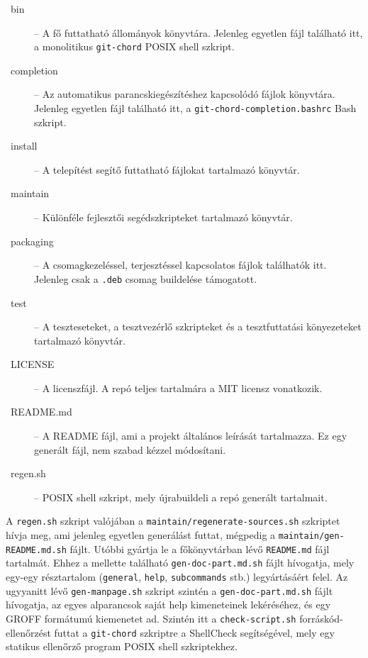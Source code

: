 \documentclass[
]{elteikthesis}[2025/03/25]
\begin{document}
\begin{description}
    \item[\faFolder~bin] --
        A fő futtatható állományok könyvtára.
        Jelenleg egyetlen fájl található itt, a monolitikus \verb|git-chord| POSIX shell szkript.
    \item[\faFolder~completion] --
        Az automatikus parancskiegészítéshez kapcsolódó fájlok könyvtára.
        Jelenleg egyetlen fájl található itt, a \verb|git-chord-completion.bashrc| Bash szkript.
    \item[\faFolder~install] --
        A telepítést segítő futtatható fájlokat tartalmazó könyvtár.
    \item[\faFolder~maintain] --
        Különféle fejlesztői segédszkripteket tartalmazó könyvtár.
    \item[\faFolder~packaging] --
        A csomagkezeléssel, terjesztéssel kapcsolatos fájlok találhatók itt.
        Jelenleg csak a \verb|.deb| csomag buildelése támogatott.
    \item[\faFolder~test] --
        A teszteseteket, a tesztvezérlő szkripteket és a tesztfuttatási könyezeteket
        tartalmazó könyvtár.
    \item[\faFile~LICENSE] --
        A licenszfájl.
        A repó teljes tartalmára a MIT licensz vonatkozik.
    \item[\faFile~README.md] --
        A README fájl, ami a projekt általános leírását tartalmazza.
        Ez egy generált fájl, nem szabad kézzel módosítani.
    \item[\faFile~regen.sh] --
        POSIX shell szkript, mely újrabuildeli a repó generált tartalmait.
\end{description}

A \verb|regen.sh| szkript valójában a \verb|maintain/regenerate-sources.sh| szkriptet hívja meg,
ami jelenleg egyetlen generálást futtat, mégpedig a \verb|maintain/gen-README.md.sh| fájlt.
Utóbbi gyártja le a főkönyvtárban lévő \verb|README.md| fájl tartalmát.
Ehhez a mellette található \verb|gen-doc-part.md.sh| fájlt hívogatja,
mely egy-egy résztartalom (\verb|general|, \verb|help|, \verb|subcommands| stb.) legyártásáért felel.
Az ugyyanitt lévő \verb|gen-manpage.sh| szkript szintén a \verb|gen-doc-part.md.sh| fájlt hívogatja,
az egyes alparancsok saját help kimeneteinek lekéréséhez,
és egy GROFF formátumú kiemenetet ad.
Szintén itt a \verb|check-script.sh| forráskód-ellenőrzést futtat a \verb|git-chord| szkriptre
a ShellCheck segítségével, mely egy statikus ellenőrző program POSIX shell szkriptekhez.
\end{document}
